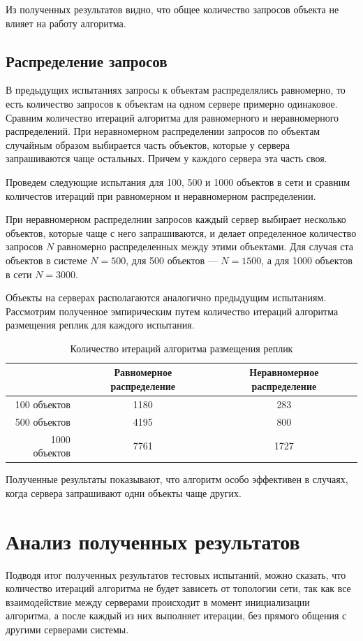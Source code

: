 			Из полученных результатов видно, что общее количество запросов объекта не влияет на работу алгоритма.

		\subsection{Распределение запросов}
			В предыдущих испытаниях запросы к объектам распределялись равномерно, то есть количество запросов к объектам на одном сервере примерно одинаковое. Сравним количество итераций 
			алгоритма для равномерного и неравномерного распределений. При неравномерном распределении запросов по объектам случайным образом выбирается часть объектов, которые у сервера 
			запрашиваются чаще остальных. Причем у каждого сервера эта часть своя.

			Проведем следующие испытания для 100, 500 и 1000 объектов в сети и сравним количестов итераций при равномерном и неравномерном распределении.

			При неравномерном распределнии запросов каждый сервер выбирает несколько объектов, которые чаще с него запрашиваются, и делает определенное количество запросов $N$ равномерно 
			распределенных между этими объектами. Для случая ста объектов в системе $N = 500$, для 500 объектов --- $N = 1500$, а для 1000 объектов в сети $N = 3000$.

			Объекты на серверах располагаются аналогично предыдущим испытаниям. Рассмотрим полученное эмпирическим путем количество итераций алгоритма размещения реплик для каждого испытания.

			\begin{table}[H]
				\small
				\centering
				\caption{Количество итераций алгоритма размещения реплик}
				\begin{tabular} {|r|c|c|}
					\hline
						& Равномерное распределение & Неравномерное распределение 	\\
					\hline
	100 объектов		& 1180						& 283 							\\
	500 объектов		& 4195						& 800 							\\
	1000 объектов		& 7761						& 1727 							\\
					\hline
				\end{tabular}
			\end{table}
	
			Полученные результаты показывают, что алгоритм особо эффективен в случаях, когда сервера запрашивают одни объекты чаще других.

	\section{Анализ полученных результатов}
		Подводя итог полученных результатов тестовых испытаний, можно сказать, что количество итераций алгоритма не будет зависеть от топологии сети, так как все взаимодействие между серверами
		происходит в момент инициализации алгоритма, а после каждый из них выполняет итерации, без прямого общения с другими серверами системы. 
		
